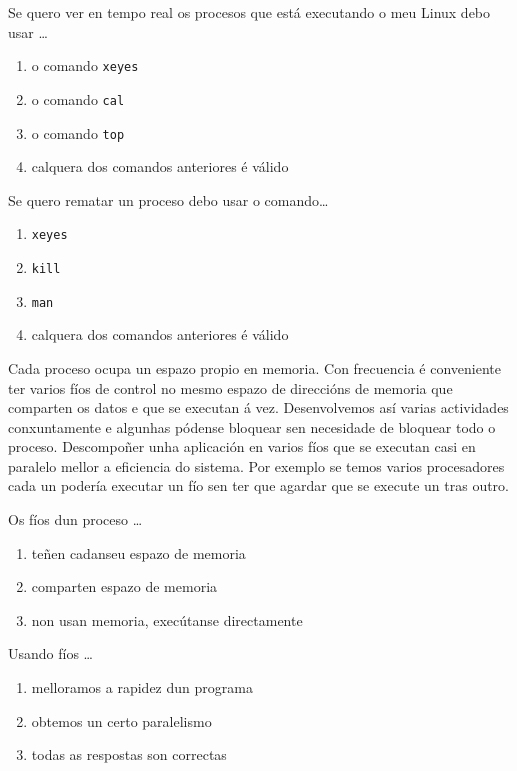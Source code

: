 \begin{diapo}\begin{frame}{ Se quero ver en tempo real os procesos que está executando o meu Linux debo usar \dots}
\begin{enumerate}
	\item  o comando \texttt{xeyes}
	\pause
	\item o comando \texttt{cal}
	\pause
	\item  o comando \texttt{top}
	\pause
	\item   calquera dos comandos anteriores é válido
\end{enumerate} 
\end{frame} 
\end{diapo} 
\begin{diapo}\begin{frame}{ Se quero rematar un proceso debo usar o comando\dots}
\begin{enumerate}
	\item   \texttt{xeyes}
	\pause
	\item \texttt{kill}
	\pause
	\item   \texttt{man}
	\pause
	\item   calquera dos comandos anteriores é válido
\end{enumerate} 
\end{frame} 
\end{diapo} 
Cada proceso ocupa un espazo propio en memoria. Con frecuencia é conveniente ter varios fíos de control no mesmo espazo de direccións de memoria que comparten os datos e  que se executan á vez. Desenvolvemos así varias actividades conxuntamente e algunhas  pódense bloquear sen necesidade de bloquear todo o proceso. Descompoñer unha aplicación en varios fíos  que se executan casi en paralelo mellor a eficiencia do sistema. Por exemplo se temos varios procesadores cada un podería executar un fío sen ter que agardar que se execute un tras outro.\\

\begin{diapo} \begin{frame}{ Os fíos dun proceso   \dots} 
\begin{enumerate}
	\item teñen cadanseu espazo de memoria\pause
	\item comparten espazo de memoria \pause
	\item non usan memoria, execútanse directamente 
\end{enumerate} \end{frame}  \end{diapo}  
\begin{diapo}\begin{frame}{ Usando fíos   \dots}
\begin{enumerate}
	\item melloramos a rapidez dun programa \pause
	\item obtemos un certo paralelismo \pause
	\item todas as respostas son correctas 
\end{enumerate} \end{frame} \end{diapo}

